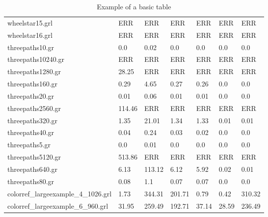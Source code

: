 \documentclass[11pt]{article}
\begin{document}
\begin{table}[h!]
\begin{tabularx}{\textwidth}{|l|X|X|X|X|X|X|}
		wheelstar15.grl & ERR & ERR & ERR & ERR & ERR & ERR \\
		wheelstar16.grl & ERR & ERR & ERR & ERR & ERR & ERR \\
		threepaths10.gr & 0.0 & 0.02 & 0.0 & 0.0 & 0.0 & 0.0 \\
		threepaths10240.gr & ERR & ERR & ERR & ERR & ERR & ERR \\
		threepaths1280.gr & 28.25 & ERR & ERR & ERR & ERR & ERR \\
		threepaths160.gr & 0.29 & 4.65 & 0.27 & 0.26 & 0.0 & 0.0 \\
		threepaths20.gr & 0.01 & 0.06 & 0.01 & 0.01 & 0.0 & 0.0 \\
		threepaths2560.gr & 114.46 & ERR & ERR & ERR & ERR & ERR \\
		threepaths320.gr & 1.35 & 21.01 & 1.34 & 1.33 & 0.01 & 0.01 \\
		threepaths40.gr & 0.04 & 0.24 & 0.03 & 0.02 & 0.0 & 0.0 \\
		threepaths5.gr & 0.0 & 0.01 & 0.0 & 0.0 & 0.0 & 0.0 \\
		threepaths5120.gr & 513.86 & ERR & ERR & ERR & ERR & ERR \\
		threepaths640.gr & 6.13 & 113.12 & 6.12 & 5.92 & 0.02 & 0.01 \\
		threepaths80.gr & 0.08 & 1.1 & 0.07 & 0.07 & 0.0 & 0.0 \\
		colorref\_largeexample\_4\_1026.grl & 1.73 & 344.31 & 201.71 & 0.79 & 0.42 & 310.32 \\
		colorref\_largeexample\_6\_960.grl & 31.95 & 259.49 & 192.71 & 37.14 & 28.59 & 236.49 \\
        \hline
    \end{tabularx}
    \caption{Example of a basic table}
    \label{tab:1}
\end{table}
\end{document}
